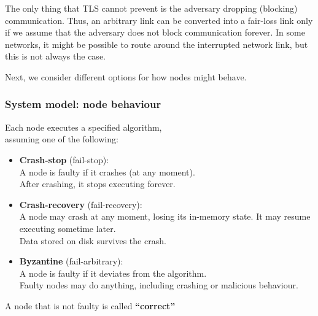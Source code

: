 The only thing that TLS cannot prevent is the adversary dropping (blocking) communication.
Thus, an arbitrary link can be converted into a fair-loss link only if we assume that the adversary does not block communication forever.
In some networks, it might be possible to route around the interrupted network link, but this is not always the case.

Next, we consider different options for how nodes might behave.

\begin{frame}
    \label{s:model-nodes}
    \frametitle{System model: node behaviour}
    Each node executes a specified algorithm,\\assuming one of the following:
    \begin{itemize}
        \item \textbf{Crash-stop} (fail-stop):\\
            A node is faulty if it crashes (at any moment).\\
            After crashing, it stops executing forever.\pause
        \item \textbf{Crash-recovery} (fail-recovery):\\
            A node may crash at any moment, losing its in-memory state.
            It may resume executing sometime later.\\
            Data stored on disk survives the crash.\pause
        \item \textbf{Byzantine} (fail-arbitrary):\\
            A node is faulty if it deviates from the algorithm.\\
            Faulty nodes may do anything, including crashing or malicious behaviour.\\[1em]
    \end{itemize}
    A node that is not faulty is called \textbf{``correct''}
\end{frame}
\label{l:model-nodes}



